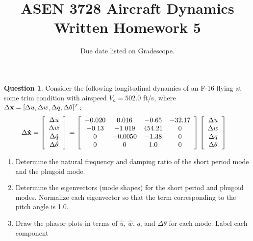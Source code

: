 \documentclass{article}
\title{ASEN 3728 Aircraft Dynamics\\Written Homework 5}
\date{Due date listed on Gradescope.}
\theoremstyle{definition}
\newtheorem{question}{Question}
\begin{document}
\maketitle

\begin{question}
    Consider the following longitudinal dynamics of an F-16 flying at some trim condition with airspeed $V_a = 502.0$ ft/s, where $\Delta{\bf x} = [{\Delta u}, {\Delta w}, {\Delta q}, {\Delta \theta}]^T$:
    \begin{align*}
    \Delta {\bf \dot{x}} = 
    \left[ \begin{array}{c} 
    \Delta \dot{u} \\
    \Delta \dot{w} \\
    \Delta \dot{q} \\
    \Delta \dot{\theta}
    \end{array} \right]
    &=
    \left[ \begin{array}{cccc}
    	 -0.020 &   0.016  & -0.65  & -32.17 \\
       -0.13  & -1.019   &       454.21 & 0\\
                0 &  -0.0050     &     -1.38	 & 0   \\
             0    &     0     &     1.0 & 0 \end{array} \right]
    \left[ \begin{array}{c} 
    \Delta u \\
    \Delta w \\
    \Delta q \\
    \Delta \theta
    \end{array} \right]
    \end{align*}
    \begin{enumerate}[label=(\alph*)]
    \item Determine the natural frequency and damping ratio of the short period mode and the phugoid mode.
    \item Determine the eigenvectors (mode shapes) for the short period and phugoid modes. Normalize each eigenvector so that the term corresponding to the pitch angle is 1.0.
    \item Draw the phasor plots in terms of $\hat{u}$, $\hat{w}$, $q$, and $\Delta \theta$ for each mode. Label each component
    \end{enumerate}


\end{question}
\end{document}
